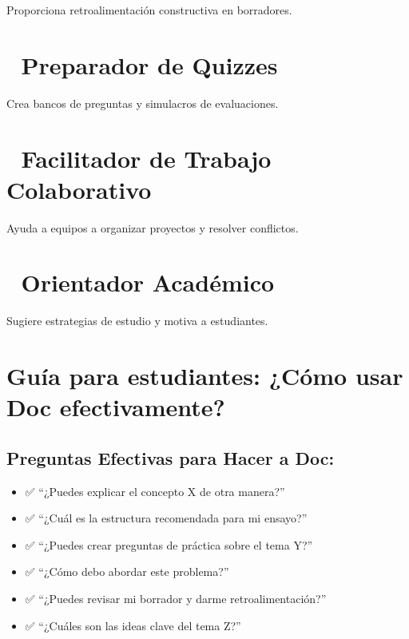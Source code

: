 \documentclass[
  spanish,
  12pt,
  letterpaper,
  DIV=11,
  numbers=noendperiod]{scrreprt}
\providecommand{\tightlist}{%
  \setlength{\itemsep}{0pt}\setlength{\parskip}{0pt}}
\begin{document}
Proporciona retroalimentación constructiva en borradores.

\section{📝 Preparador de Quizzes}\label{preparador-de-quizzes}

Crea bancos de preguntas y simulacros de evaluaciones.

\section{🤝 Facilitador de Trabajo
Colaborativo}\label{facilitador-de-trabajo-colaborativo}

Ayuda a equipos a organizar proyectos y resolver conflictos.

\section{🎯 Orientador Académico}\label{orientador-acaduxe9mico}

Sugiere estrategias de estudio y motiva a estudiantes.

\section{Guía para estudiantes: ¿Cómo usar Doc
efectivamente?}\label{guuxeda-para-estudiantes-cuxf3mo-usar-doc-efectivamente}

\subsection{Preguntas Efectivas para Hacer a
Doc:}\label{preguntas-efectivas-para-hacer-a-doc}

\begin{itemize}
\tightlist
\item
  ✅ ``¿Puedes explicar el concepto X de otra manera?''
\item
  ✅ ``¿Cuál es la estructura recomendada para mi ensayo?''
\item
  ✅ ``¿Puedes crear preguntas de práctica sobre el tema Y?''
\item
  ✅ ``¿Cómo debo abordar este problema?''
\item
  ✅ ``¿Puedes revisar mi borrador y darme retroalimentación?''
\item
  ✅ ``¿Cuáles son las ideas clave del tema Z?''
\end{itemize}
\end{document}
